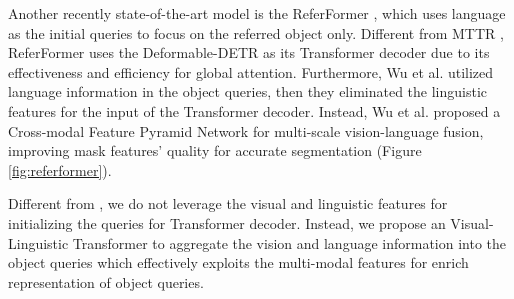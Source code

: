 \pagebreak
Another recently state-of-the-art model is the ReferFormer \cite{wu_language_2022}, which uses language as the initial queries to focus on the referred object only. Different from MTTR \cite{botach_end--end_2022}, ReferFormer uses the Deformable-DETR as its Transformer decoder due to its effectiveness and efficiency for global attention. Furthermore, Wu et al. \cite{wu_language_2022} utilized language information in the object queries, then they eliminated the linguistic features for the input of the Transformer decoder. Instead, Wu et al. proposed a Cross-modal Feature Pyramid Network for multi-scale vision-language fusion, improving mask features' quality for accurate segmentation (Figure \ref{fig:referformer}).  

Different from \cite{wu_language_2022, ding_vision-language_2021, yang_lavt_2022}, we do not leverage the visual and linguistic features for initializing the queries for Transformer decoder. Instead, we propose an Visual-Linguistic Transformer to aggregate the vision and language information into the object queries which effectively exploits the multi-modal features for enrich representation of object queries. 